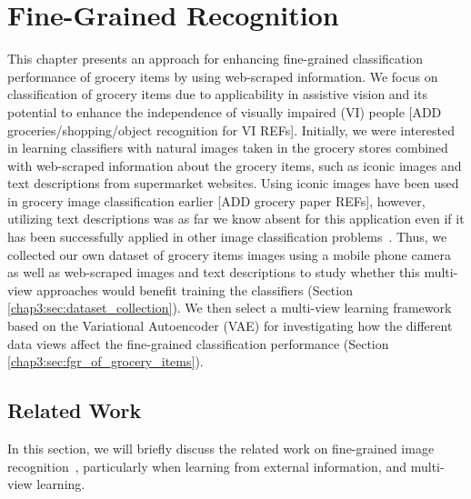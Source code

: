 
\chapter{Fine-Grained Recognition}
\label{chap3}


This chapter presents an approach for enhancing fine-grained classification performance of grocery items by using web-scraped information. We focus on classification of grocery items due to applicability in assistive vision and its potential to enhance the independence of visually impaired (VI) people [ADD groceries/shopping/object recognition for VI REFs]. Initially, we were interested in learning classifiers with natural images taken in the grocery stores combined with web-scraped information about the grocery items, such as iconic images and text descriptions from supermarket websites. Using iconic images have been used in grocery image classification earlier [ADD grocery paper REFs], however, utilizing text descriptions was as far we know absent for this application even if it has been successfully applied in other image classification problems~\cite{wah2011cub, nilsback2008automated, bujwid2021large}. Thus, we collected our own dataset of grocery items images using a mobile phone camera as well as web-scraped images and text descriptions to study whether this multi-view approaches would benefit training the classifiers (Section \ref{chap3:sec:dataset_collection}). We then select a multi-view learning framework based on the Variational Autoencoder (VAE) for investigating how the different data views affect the fine-grained classification performance (Section \ref{chap3:sec:fgr_of_grocery_items}). 


\section{Related Work}\label{chap3:sec:related_work}

In this section, we will briefly discuss the related work on fine-grained image recognition~\cite{wei2021fine}, particularly when learning from external information, and multi-view learning. 

